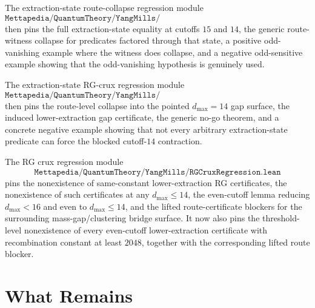 \documentclass[11pt]{article}
\newcommand{\lean}[1]{\texttt{#1}}
\begin{document}
The extraction-state route-collapse regression module
\[
  \lean{Mettapedia/QuantumTheory/YangMills/ExtractionStateRouteCollapseRegression.lean}
\]
then pins the full extraction-state equality at cutoffs \(15\) and \(14\), the
generic route-witness collapse for predicates factored through that state, a
positive odd-vanishing example where the witness does collapse, and a negative
odd-sensitive example showing that the odd-vanishing hypothesis is genuinely
used.

The extraction-state RG-crux regression module
\[
  \lean{Mettapedia/QuantumTheory/YangMills/ExtractionStateRGCruxRegression.lean}
\]
then pins the route-level collapse into the pointed \(d_{\max}=14\) gap
surface, the induced lower-extraction gap certificate, the generic no-go
theorem, and a concrete negative example showing that not every arbitrary
extraction-state predicate can force the blocked cutoff-\(14\) contraction.

The RG crux regression module
\[
  \lean{Mettapedia/QuantumTheory/YangMills/RGCruxRegression.lean}
\]
pins the nonexistence of same-constant lower-extraction RG certificates, the
nonexistence of such certificates at any \(d_{\max}\le 14\), the even-cutoff
lemma reducing \(d_{\max}<16\) and even to \(d_{\max}\le14\), and the lifted
route-certificate blockers for the surrounding mass-gap/clustering bridge
surface.  It now also pins the threshold-level nonexistence of every
even-cutoff lower-extraction certificate with recombination constant at least
\(2048\), together with the corresponding lifted route blocker.

\section{What Remains}
\end{document}
